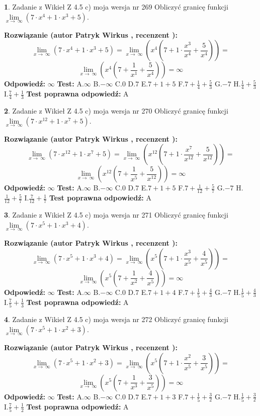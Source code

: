 \documentclass[12pt, a4paper]{article}
\theoremstyle{definition} %
\newtheorem{zad}{}
\newcommand{\zadStart}[1]{\begin{zad}#1\newline}
\newcommand{\zadStop}{\end{zad}}
\newcommand{\rozwStart}[2]{\noindent \textbf{Rozwiązanie (autor #1 , recenzent #2): }\newline}
\newcommand{\rozwStop}{\newline}
\newcommand{\odpStart}{\noindent \textbf{Odpowiedź:}\newline}
\newcommand{\odpStop}{\newline}
\newcommand{\testStart}{\noindent \textbf{Test:}\newline}
\newcommand{\testStop}{\newline}
\newcommand{\kluczStart}{\noindent \textbf{Test poprawna odpowiedź:}\newline}
\newcommand{\kluczStop}{\newline}
\begin{document}
\zadStart{Zadanie z Wikieł Z 4.5 c) moja wersja nr 269}
Obliczyć granicę funkcji  $\lim\limits_{x\to\ \infty}(7 \cdot x^{4}+1 \cdot x^{3}+5)$.
\zadStop
\rozwStart{Patryk Wirkus}{}
$$\lim\limits_{x\to\ \infty}(7 \cdot x^{4}+1 \cdot x^{3}+5) = \lim\limits_{x\to\ \infty}(x^{4}(7 +1 \cdot \frac{x^{3}}{x^{4}}+\frac{5}{x^{4}})) =$$ $$\lim\limits_{x\to\ \infty}(x^{4}(7 +\frac{1}{x^{1}}+\frac{5}{x^{4}})) =\infty$$
\rozwStop
\odpStart
$\infty$
\odpStop
\testStart
A.$\infty$ B.$-\infty$ C.$0$ D.$7$ E.$7 + 1 + 5$
F.$7+\frac{1}{4}+\frac{5}{3}$ G.$-7$
H.$\frac{1}{4}+\frac{5}{3}$
I.$\frac{7}{4}+\frac{1}{3}$
\testStop
\kluczStart
A
\kluczStop



\zadStart{Zadanie z Wikieł Z 4.5 c) moja wersja nr 270}
Obliczyć granicę funkcji  $\lim\limits_{x\to\ \infty}(7 \cdot x^{12}+1 \cdot x^{7}+5)$.
\zadStop
\rozwStart{Patryk Wirkus}{}
$$\lim\limits_{x\to\ \infty}(7 \cdot x^{12}+1 \cdot x^{7}+5) = \lim\limits_{x\to\ \infty}(x^{12}(7 +1 \cdot \frac{x^{7}}{x^{12}}+\frac{5}{x^{12}})) =$$ $$\lim\limits_{x\to\ \infty}(x^{12}(7 +\frac{1}{x^{5}}+\frac{5}{x^{12}})) =\infty$$
\rozwStop
\odpStart
$\infty$
\odpStop
\testStart
A.$\infty$ B.$-\infty$ C.$0$ D.$7$ E.$7 + 1 + 5$
F.$7+\frac{1}{12}+\frac{5}{7}$ G.$-7$
H.$\frac{1}{12}+\frac{5}{7}$
I.$\frac{7}{12}+\frac{1}{7}$
\testStop
\kluczStart
A
\kluczStop



\zadStart{Zadanie z Wikieł Z 4.5 c) moja wersja nr 271}
Obliczyć granicę funkcji  $\lim\limits_{x\to\ \infty}(7 \cdot x^{5}+1 \cdot x^{3}+4)$.
\zadStop
\rozwStart{Patryk Wirkus}{}
$$\lim\limits_{x\to\ \infty}(7 \cdot x^{5}+1 \cdot x^{3}+4) = \lim\limits_{x\to\ \infty}(x^{5}(7 +1 \cdot \frac{x^{3}}{x^{5}}+\frac{4}{x^{5}})) =$$ $$\lim\limits_{x\to\ \infty}(x^{5}(7 +\frac{1}{x^{2}}+\frac{4}{x^{5}})) =\infty$$
\rozwStop
\odpStart
$\infty$
\odpStop
\testStart
A.$\infty$ B.$-\infty$ C.$0$ D.$7$ E.$7 + 1 + 4$
F.$7+\frac{1}{5}+\frac{4}{3}$ G.$-7$
H.$\frac{1}{5}+\frac{4}{3}$
I.$\frac{7}{5}+\frac{1}{3}$
\testStop
\kluczStart
A
\kluczStop



\zadStart{Zadanie z Wikieł Z 4.5 c) moja wersja nr 272}
Obliczyć granicę funkcji  $\lim\limits_{x\to\ \infty}(7 \cdot x^{5}+1 \cdot x^{2}+3)$.
\zadStop
\rozwStart{Patryk Wirkus}{}
$$\lim\limits_{x\to\ \infty}(7 \cdot x^{5}+1 \cdot x^{2}+3) = \lim\limits_{x\to\ \infty}(x^{5}(7 +1 \cdot \frac{x^{2}}{x^{5}}+\frac{3}{x^{5}})) =$$ $$\lim\limits_{x\to\ \infty}(x^{5}(7 +\frac{1}{x^{3}}+\frac{3}{x^{5}})) =\infty$$
\rozwStop
\odpStart
$\infty$
\odpStop
\testStart
A.$\infty$ B.$-\infty$ C.$0$ D.$7$ E.$7 + 1 + 3$
F.$7+\frac{1}{5}+\frac{3}{2}$ G.$-7$
H.$\frac{1}{5}+\frac{3}{2}$
I.$\frac{7}{5}+\frac{1}{2}$
\testStop
\kluczStart
A
\kluczStop
\end{document}

